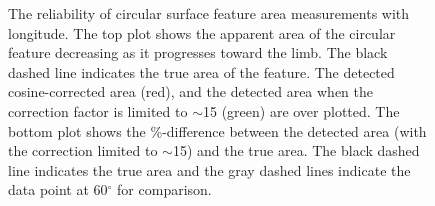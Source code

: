 \begin{figure}[!t]
\caption[Longitude dependence of area uncertainty.]{The reliability of circular surface feature area measurements with longitude. The top plot shows the apparent area of the circular feature decreasing as it progresses toward the limb. The black dashed line indicates the true area of the feature. The detected cosine-corrected area (red), and the detected area when the correction factor is limited to $\sim$15 (green) are over plotted. The bottom plot shows the \%-difference between the detected area (with the correction limited to $\sim$15) and the true area. The black dashed line indicates the true area and the gray dashed lines indicate the data point at 60$^\circ$ for comparison.}
\label{fig:spotareaerr}
\end{figure}

